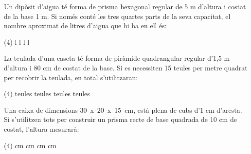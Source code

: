 \begin{autoaval}{55}
\begin{mylist}
\exer  Un dipòsit d'aigua té forma de prisma hexagonal regular de 5 m d'altura i costat de la base 1 m. Si només conté les tres quartes parts de la seva capacitat, el nombre aproximat de litres d'aigua que hi ha en ell és:

\begin{tasks}(4)
	 l    
	 l   
	 l 
	 l
\end{tasks}


\exer  La teulada d'una caseta té forma de piràmide quadrangular regular d'1,5 m d'altura i 80 cm de costat de la base. Si es necessiten 15 teules per metre quadrat per recobrir la teulada, en total s'utilitzaran: 

\begin{tasks}(4)
	 teules   
	 teules   
	 teules 
	 teules
\end{tasks}

	\exer  Una caixa de dimensions 30~x~20~x~15~cm, està plena de cubs d'1 cm d'aresta. Si s'utilitzen tots per construir un prisma recte de base quadrada de 10 cm de costat, l'altura mesurarà:

\begin{tasks}(4)
	 cm    
	 cm   
	 cm   
	 cm
\end{tasks}


\end{mylist}
\end{autoaval}
\newpage

